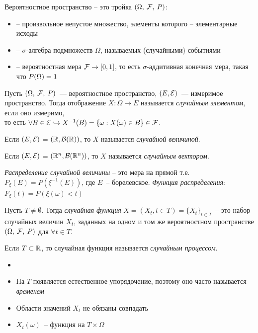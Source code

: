 \begin{definition}
    Вероятностное пространство -- это тройка $\probspace$:
    \begin{itemize}[noitemsep, topsep=1pt]
        \item[$\Omega$] -- произвольное непустое множество, элементы которого -- элементарные исходы
        \item[$\mathcal{F}$] -- $\sigma$-алгебра подмножеств $\Omega$, называемых (случайными) событиями
        \item[$P$] -- вероятностная мера $\F \to [0,1]$, то есть $\sigma$-аддитивная конечная мера, такая что $\P(\Omega) = 1$
    \end{itemize}
\end{definition}

\begin{definition}
    Пусть $\probspace$~--- вероятностное пространство, $(E, \Eps)$~--- измеримое пространство. Тогда отображение $X : \Omega \rightarrow E$ называется \textit{случайным элементом}, если оно измеримо,\\
    то есть $\forall B \in \Eps \hookrightarrow X^{-1}(B) = \{ \omega: X(\omega) \in B \} \in \F$.
\end{definition}

Если $(E, \Eps)$ = $(\R, \B(\R))$, то $X$ называется \textit{случайной величиной}.

Если $(E, \Eps)$ = $(\R^n, \B(\R^n))$, то $X$ называется \textit{случайным вектором}.

\begin{definition}
    \textit{Распределение случайной величины} -- это мера на прямой т.е. $P_\xi(E) = P(\xi^{-1}(E))$, где $E$~-- борелевское. \textit{Функция распределения}: $F_\xi(t) = P(\xi(\omega)<t)$
\end{definition}

\begin{definition}
    Пусть $T\neq \emptyset$. Тогда \textit{случайная функция} $X = (X_t, t\in T)= \{X_t\}_{t\in T}$~-- это набор случайных величин $X_t$, заданных на одном и том же вероятностном пространстве $\probspace$ для $\forall t\in T$.
\end{definition}

\begin{definition}
    Если $T \subset \R$, то случайная функция называется \textit{случайным процессом}.
\end{definition}

\begin{note}
    \begin{itemize}[noitemsep, topsep=1pt]
        \item[] 
        \item На $T$ появляется естественное упорядочение, поэтому оно часто называется \textit{временем}
        \item Области значений $X_t$ не обязаны совпадать
        \item $X_t(\omega)$~-- функция на $T\times\Omega$
    \end{itemize}
    
\end{note}

